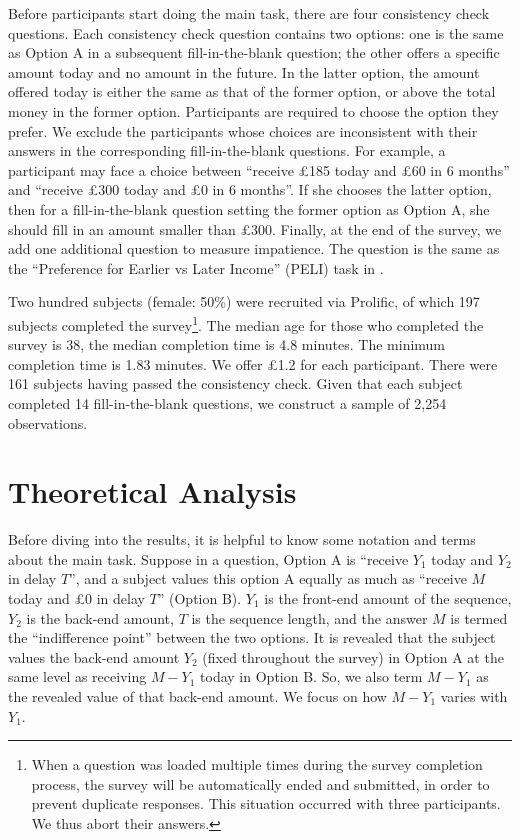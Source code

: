 \documentclass[
  12pt,
]{article}
\begin{document}
Before participants start doing the main task, there are four
consistency check questions. Each consistency check question contains
two options: one is the same as Option A in a subsequent
fill-in-the-blank question; the other offers a specific amount today and
no amount in the future. In the latter option, the amount offered today
is either the same as that of the former option, or above the total
money in the former option. Participants are required to choose the
option they prefer. We exclude the participants whose choices are
inconsistent with their answers in the corresponding fill-in-the-blank
questions. For example, a participant may face a choice between
``receive £185 today and £60 in 6 months'' and ``receive £300 today and
£0 in 6 months''. If she chooses the latter option, then for a
fill-in-the-blank question setting the former option as Option A, she
should fill in an amount smaller than £300. Finally, at the end of the
survey, we add one additional question to measure impatience. The
question is the same as the ``Preference for Earlier vs Later Income''
(PELI) task in \citet{burro2022patience}.

Two hundred subjects (female: 50\%) were recruited via Prolific, of
which 197 subjects completed the survey\footnote{When a question was
  loaded multiple times during the survey completion process, the survey
  will be automatically ended and submitted, in order to prevent
  duplicate responses. This situation occurred with three participants.
  We thus abort their answers.}. The median age for those who completed
the survey is 38, the median completion time is 4.8 minutes. The minimum
completion time is 1.83 minutes. We offer £1.2 for each participant.
There were 161 subjects having passed the consistency check. Given that
each subject completed 14 fill-in-the-blank questions, we construct a
sample of 2,254 observations.

\hypertarget{theoretical-analysis}{%
\section{Theoretical Analysis}\label{theoretical-analysis}}

Before diving into the results, it is helpful to know some notation and
terms about the main task. Suppose in a question, Option A is ``receive
\(Y_1\) today and \(Y_2\) in delay \(T\)'', and a subject values this
option A equally as much as ``receive \(M\) today and £0 in delay
\(T\)'' (Option B). \(Y_1\) is the front-end amount of the sequence,
\(Y_2\) is the back-end amount, \(T\) is the sequence length, and the
answer \(M\) is termed the ``indifference point'' between the two
options. It is revealed that the subject values the back-end amount
\(Y_2\) (fixed throughout the survey) in Option A at the same level as
receiving \(M - Y_1\) today in Option B. So, we also term \(M - Y_1\) as
the revealed value of that back-end amount. We focus on how \(M - Y_1\)
varies with \(Y_1\).
\end{document}
